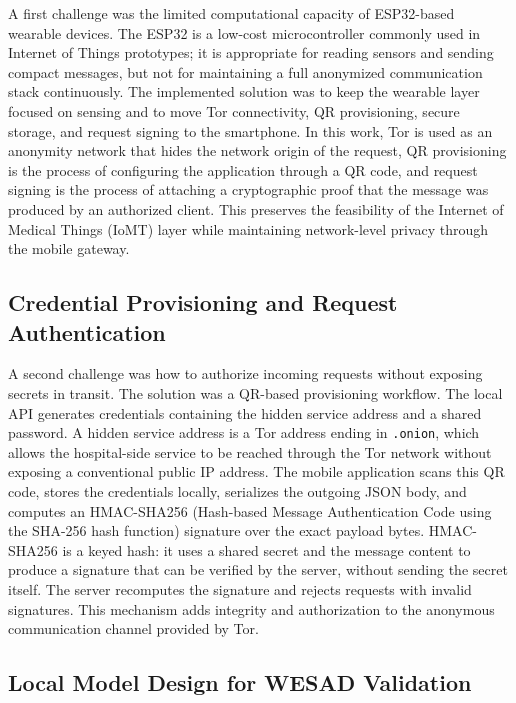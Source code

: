 \documentclass[12pt]{article}
\begin{document}
A first challenge was the limited computational capacity of ESP32-based wearable devices. The ESP32 is a low-cost microcontroller commonly used in Internet of Things prototypes; it is appropriate for reading sensors and sending compact messages, but not for maintaining a full anonymized communication stack continuously. The implemented solution was to keep the wearable layer focused on sensing and to move Tor connectivity, QR provisioning, secure storage, and request signing to the smartphone. In this work, Tor is used as an anonymity network that hides the network origin of the request, QR provisioning is the process of configuring the application through a QR code, and request signing is the process of attaching a cryptographic proof that the message was produced by an authorized client. This preserves the feasibility of the Internet of Medical Things (IoMT) layer while maintaining network-level privacy through the mobile gateway.

\subsection{Credential Provisioning and Request Authentication}

A second challenge was how to authorize incoming requests without exposing secrets in transit. The solution was a QR-based provisioning workflow. The local API generates credentials containing the hidden service address and a shared password. A hidden service address is a Tor address ending in \texttt{.onion}, which allows the hospital-side service to be reached through the Tor network without exposing a conventional public IP address. The mobile application scans this QR code, stores the credentials locally, serializes the outgoing JSON body, and computes an HMAC-SHA256 (Hash-based Message Authentication Code using the SHA-256 hash function) signature over the exact payload bytes. HMAC-SHA256 is a keyed hash: it uses a shared secret and the message content to produce a signature that can be verified by the server, without sending the secret itself. The server recomputes the signature and rejects requests with invalid signatures. This mechanism adds integrity and authorization to the anonymous communication channel provided by Tor.

\subsection{Local Model Design for WESAD Validation}
\end{document}
